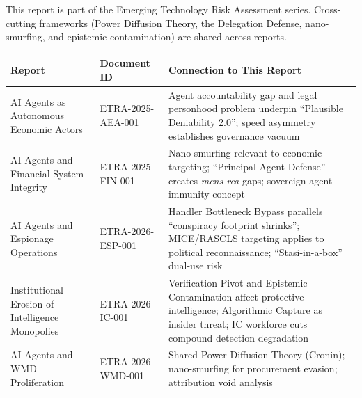 \documentclass[11pt,letterpaper]{article}
\makeatletter
\newcommand{\etraneed}[1]{\par\if@nobreak\else\penalty\z@\ifdim\pagegoal<\maxdimen\ifdim\dimexpr\pagegoal-\pagetotal\relax<\dimexpr#1\relax\newpage\fi\fi\fi}
\makeatother
\begin{document}
\clearpage
{\tableofcontents}\thispagestyle{fancy}

\bigskip

\etraneed{0.62\textheight}
\begin{infobox}
This report is part of the Emerging Technology Risk Assessment series. Cross-cutting frameworks (Power Diffusion Theory, the Delegation Defense, nano-smurfing, and epistemic contamination) are shared across reports.

\vspace{0.5em}
\begin{center}
\footnotesize
\begin{tabular}{L{3.4cm}L{3.1cm}L{7.3cm}}
\toprule
\textbf{Report} & \textbf{Document ID} & \textbf{Connection to This Report} \\
\midrule
AI Agents as Autonomous Economic Actors & ETRA-2025-AEA-001 & Agent accountability gap and legal personhood problem underpin ``Plausible Deniability 2.0''; speed asymmetry establishes governance vacuum \\
AI Agents and Financial System Integrity & ETRA-2025-FIN-001 & Nano-smurfing relevant to economic targeting; ``Principal-Agent Defense'' creates \textit{mens rea} gaps; sovereign agent immunity concept \\
AI Agents and Espionage Operations & ETRA-2026-ESP-001 & Handler Bottleneck Bypass parallels ``conspiracy footprint shrinks''; MICE/RASCLS targeting applies to political reconnaissance; ``Stasi-in-a-box'' dual-use risk \\
Institutional Erosion of Intelligence Monopolies & ETRA-2026-IC-001 & Verification Pivot and Epistemic Contamination affect protective intelligence; Algorithmic Capture as insider threat; IC workforce cuts compound detection degradation \\
AI Agents and WMD Proliferation & ETRA-2026-WMD-001 & Shared Power Diffusion Theory (Cronin); nano-smurfing for procurement evasion; attribution void analysis \\
\bottomrule
\end{tabular}
\end{center}
\end{infobox}
\end{document}
